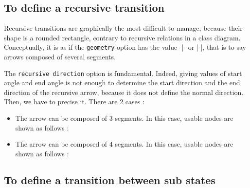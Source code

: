 \documentclass[a4paper,11pt]{report}
\newcommand{\inputTikZ}[1]{%
  }%
\newcommand{\inputTikZ}[1]{%
    \texttt{[image: fig/\#1.pdf]}%
  }%
\begin{document}
\subsection{To define a recursive transition}\label{s.rectrans}

Recursive transitions are graphically the most difficult to manage, because their shape is a rounded rectangle, contrary to recursive relations in a class diagram. Conceptually, it is as if the {\tt geometry} option has the value -|- or |-|, that is to say arrows composed of several segments.

\medskip

\begin{minipage}{0.51\textwidth}

\end{minipage}
\begin{minipage}{0.49\textwidth}
\begin{center}
\inputTikZ{transitionrec}
\end{center}
\end{minipage}

\medskip

The {\tt recursive direction} option is fundamental. Indeed, giving values of start angle and end angle is not enough to determine the start direction and the end direction of the recursive arrow, because it does not define the normal direction. Then, we have to precise it. There are 2 cases :

\medskip

\begin{itemize}
\item The arrow can be composed of 3 segments. In this case, usable nodes are shown as follows :

\begin{center}
\inputTikZ{transitionrec-rtr-ptname}
\end{center}

\item The arrow can be composed of 4 segments. In this case, usable nodes are shown as follows :

\medskip

\begin{center}
\inputTikZ{transitionrec-rtb-ptname}
\end{center}

\vspace{-4cm}

\end{itemize}

\subsection{To define a transition between sub states}\label{ss.substatetrans}
\end{document}
